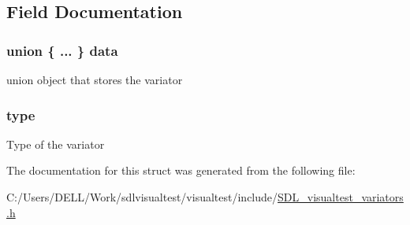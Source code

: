 \subsection{Field Documentation}
\hypertarget{struct_s_d_l_visual_test___variator_af99a8790e729d599c656a2070e672e9a}{
\subsubsection[{data}]{\setlength{\rightskip}{0pt plus 5cm}union \{ ... \}   data}}\label{struct_s_d_l_visual_test___variator_af99a8790e729d599c656a2070e672e9a}
union object that stores the variator \hypertarget{struct_s_d_l_visual_test___variator_a24d4399dc1877c1843e120e7b027ae64}{
\subsubsection[{type}]{ type}}\label{struct_s_d_l_visual_test___variator_a24d4399dc1877c1843e120e7b027ae64}
Type of the variator 

The documentation for this struct was generated from the following file\-:\begin{DoxyCompactItemize}
\item 
C\-:/\-Users/\-D\-E\-L\-L/\-Work/sdlvisualtest/visualtest/include/\hyperlink{_s_d_l__visualtest__variators_8h}{S\-D\-L\-\_\-visualtest\-\_\-variators.\-h}\end{DoxyCompactItemize}
